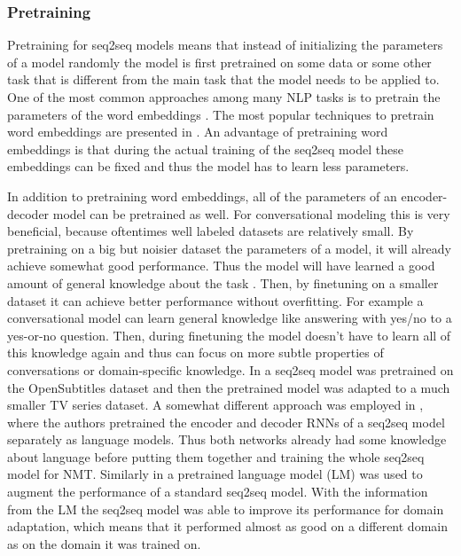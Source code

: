 \documentclass[12pt]{article}
\begin{document}
\subsubsection{Pretraining} \label{sssec:pretrain}
Pretraining for seq2seq models means that instead of initializing the parameters of a model randomly the model is first pretrained on some data or some other task that is different from the main task that the model needs to be applied to. One of the most common approaches among many NLP tasks is to pretrain the parameters of the word embeddings \cite{Chen:2014,Serban:2015,Akasaki:2017,Lample:2016,Serban:2017}. The most popular techniques to pretrain word embeddings are presented in \cite{Mikolov:2013,Mikolov_skipgram:2013}. An advantage of pretraining word embeddings is that during the actual training of the seq2seq model these embeddings can be fixed and thus the model has to learn less parameters. 

In addition to pretraining word embeddings, all of the parameters of an encoder-decoder model can be pretrained as well. For conversational modeling this is very beneficial, because oftentimes well labeled datasets are relatively small. By pretraining on a big but noisier dataset the parameters of a model, it will already achieve somewhat good performance. Thus the model will have learned a good amount of general knowledge about the task \cite{Li:2016,Serban:2015}. Then, by finetuning on a smaller dataset it can achieve better performance without overfitting. For example a conversational model can learn general knowledge like answering with yes/no to a yes-or-no question. Then, during finetuning the model doesn't have to learn all of this knowledge again and thus can focus on more subtle properties of conversations or domain-specific knowledge. In \cite{Li:2016} a seq2seq model was pretrained on the OpenSubtitles dataset \cite{OpenSubtitles:2016} and then the pretrained model was adapted to a much smaller TV series dataset. A somewhat different approach was employed in \cite{Ramachandran:2016}, where the authors pretrained the encoder and decoder RNNs of a seq2seq model separately as language models. Thus both networks already had some knowledge about language before putting them together and training the whole seq2seq model for NMT. Similarly in \cite{Sriram:2017} a pretrained language model (LM) was used to augment the performance of a standard seq2seq model. With the information from the LM the seq2seq model was able to improve its performance for domain adaptation, which means that it performed almost as good on a different domain as on the domain it was trained on.
\end{document}
